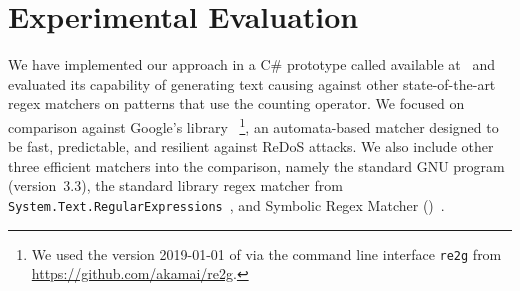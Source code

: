 \documentclass[acmsmall,screen]{acmart}
\newif\ifTR
\begin{document}
%
%

\section{Experimental Evaluation}\label{sec:experiments}
\vspace{-0.5mm}

We have implemented our approach in a C\#
prototype called \catool
available at~
and evaluated its capability of generating text causing 
 against other
state-of-the-art regex matchers on patterns that use the counting operator.
We focused on comparison against
Google's \retwo library~\cite{re2}%
\footnote{%
  We used the version 2019-01-01 of \retwo via the command line interface \texttt{re2g} from
  \url{https://github.com/akamai/re2g}.
}, an automata-based matcher designed to be fast, predictable, and resilient against ReDoS attacks.
We also include other three efficient matchers into the comparison, namely
the standard GNU \grep program~\cite{grep} (version~3.3),
the \dotnet standard library regex matcher from
\texttt{System.Text.RegularExpressions}~\cite{dotnet}, and
Symbolic Regex Matcher (\srm)~\cite{VSXW19}.
\end{document}
